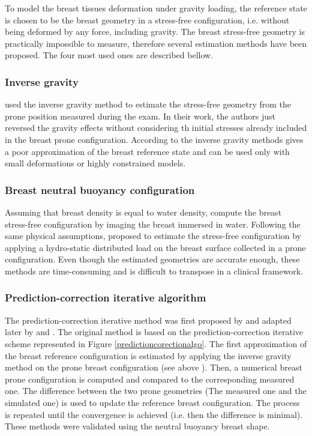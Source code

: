 To model the breast tissues deformation under gravity loading,  the reference state is chosen to be the breast geometry in a stress-free configuration, i.e. without being deformed by any force, including gravity. The breast stress-free geometry is practically impossible to measure, therefore several estimation methods have been proposed. The four most used ones are described bellow.

 
 
  \subsubsection*{Inverse gravity}\label{subsubsection:inversegravity}
 \citep{palomar_finite_2008, sturgeon_finite_element_2016} used the inverse gravity method to estimate the stress-free geometry from the prone position measured during the exam. In their work, the authors just reversed the gravity effects without considering th initial stresses already included in the breast prone configuration. According to \cite{eiben_breast_2014} the inverse gravity methods gives a poor approximation of the breast reference state and can be used only with small deformations or highly constrained models.  

 \subsubsection*{Breast neutral buoyancy configuration}
 Assuming that breast density is equal to water density, \cite{rajagopal_creating_2008} compute the breast stress-free configuration by imaging the breast immersed in water. Following the same physical assumptions, \cite{kuhlmann_mechanical_2013} proposed to estimate the stress-free configuration by applying a hydro-static distributed load on the breast surface collected in a prone configuration. Even though the estimated geometries are accurate enough, these methods are time-consuming and is difficult to transpose in a clinical framework. 

 \subsubsection*{Prediction-correction iterative algorithm}
 The prediction-correction iterative method was first proposed by \citep{govindjee_computational_1998} and adapted later by \cite{carter_biomechanical_2009} and \cite{eiben_breast_2014}. The original method is based on the prediction-correction iterative scheme represented in Figure \ref{predictioncorectionalgo}. The first approximation of the breast reference configuration is estimated by applying the inverse gravity method on the prone breast configuration (see above ).  Then, a numerical breast prone configuration is computed and compared to the corresponding measured one. The difference between the two prone geometries (The measured one and the simulated one) is used to update the reference breast configuration. The process is repeated until the convergence is achieved (i.e. then the difference is minimal). These methods were validated using the neutral buoyancy breast shape.

